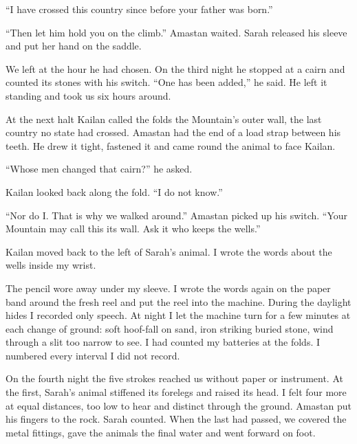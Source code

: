 ``I have crossed this country since before your father was born.''\par

``Then let him hold you on the climb.'' Amastan waited. Sarah released his sleeve and put her hand on the saddle.\par

We left at the hour he had chosen. On the third night he stopped at a cairn and counted its stones with his switch. ``One has been added,'' he said. He left it standing and took us six hours around.\par

At the next halt Kailan called the folds the Mountain's outer wall, the last country no state had crossed. Amastan had the end of a load strap between his teeth. He drew it tight, fastened it and came round the animal to face Kailan.\par

``Whose men changed that cairn?'' he asked.\par

Kailan looked back along the fold. ``I do not know.''\par

``Nor do I. That is why we walked around.'' Amastan picked up his switch. ``Your Mountain may call this its wall. Ask it who keeps the wells.''\par

Kailan moved back to the left of Sarah's animal. I wrote the words about the wells inside my wrist.\par

The pencil wore away under my sleeve. I wrote the words again on the paper band around the fresh reel and put the reel into the machine. During the daylight hides I recorded only speech. At night I let the machine turn for a few minutes at each change of ground: soft hoof-fall on sand, iron striking buried stone, wind through a slit too narrow to see. I had counted my batteries at the folds. I numbered every interval I did not record.\par

On the fourth night the five strokes reached us without paper or instrument. At the first, Sarah's animal stiffened its forelegs and raised its head. I felt four more at equal distances, too low to hear and distinct through the ground. Amastan put his fingers to the rock. Sarah counted. When the last had passed, we covered the metal fittings, gave the animals the final water and went forward on foot.\par

